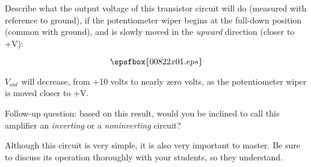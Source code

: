 

Describe what the output voltage of this transistor circuit will do (measured with reference to ground), if the potentiometer wiper begins at the full-down position (common with ground), and is slowly moved in the {\it upward} direction (closer to +V):

$$\epsfbox{00822x01.eps}$$







$V_{out}$ will decrease, from +10 volts to nearly zero volts, as the potentiometer wiper is moved closer to +V.

\vskip 10pt

Follow-up question: based on this result, would you be inclined to call this amplifier an {\it inverting} or a {\it noninverting} circuit?







Although this circuit is very simple, it is also very important to master.  Be sure to discuss its operation thoroughly with your students, so they understand.




